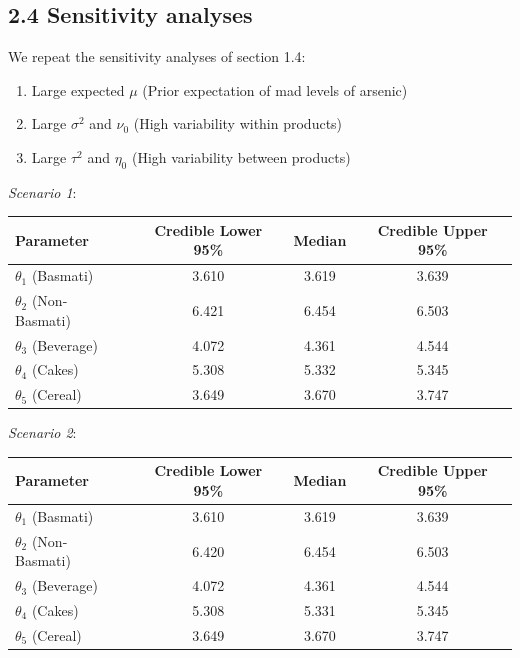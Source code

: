 \documentclass[]{article}
\begin{document}
\subsection{2.4 Sensitivity analyses}

We repeat the sensitivity analyses of section 1.4:

\begin{enumerate}
  \item Large expected $\mu$ (Prior expectation of mad levels of arsenic)
  \item Large $\sigma^2$ and $\nu_0$ (High variability within products)
  \item Large $\tau^2$ and $\eta_0$ (High variability between products)
\end{enumerate}

\textit{Scenario 1}:

\begin{center}
  \begin{tabular}{l c c c}
  \hline Parameter & Credible Lower 95\% & Median & Credible Upper 95\%  \\ \hline
    $\theta_1$ (Basmati) & 3.610 & 3.619 & 3.639 \\ 
    $\theta_2$ (Non-Basmati) & 6.421 & 6.454 & 6.503 \\
    $\theta_3$ (Beverage) & 4.072 & 4.361 & 4.544 \\
    $\theta_4$ (Cakes) & 5.308 & 5.332 & 5.345 \\
    $\theta_5$ (Cereal) & 3.649 & 3.670 & 3.747 \\ \hline
  \end{tabular}
\end{center}

\textit{Scenario 2}:

\begin{center}
  \begin{tabular}{l c c c}
  \hline Parameter & Credible Lower 95\% & Median & Credible Upper 95\%  \\ \hline
    $\theta_1$ (Basmati) & 3.610 & 3.619 & 3.639 \\ 
    $\theta_2$ (Non-Basmati) & 6.420 & 6.454 & 6.503 \\
    $\theta_3$ (Beverage) & 4.072 & 4.361 & 4.544 \\
    $\theta_4$ (Cakes) & 5.308 & 5.331 & 5.345 \\
    $\theta_5$ (Cereal) & 3.649 & 3.670 & 3.747 \\ \hline
  \end{tabular}
\end{center}
\end{document}
